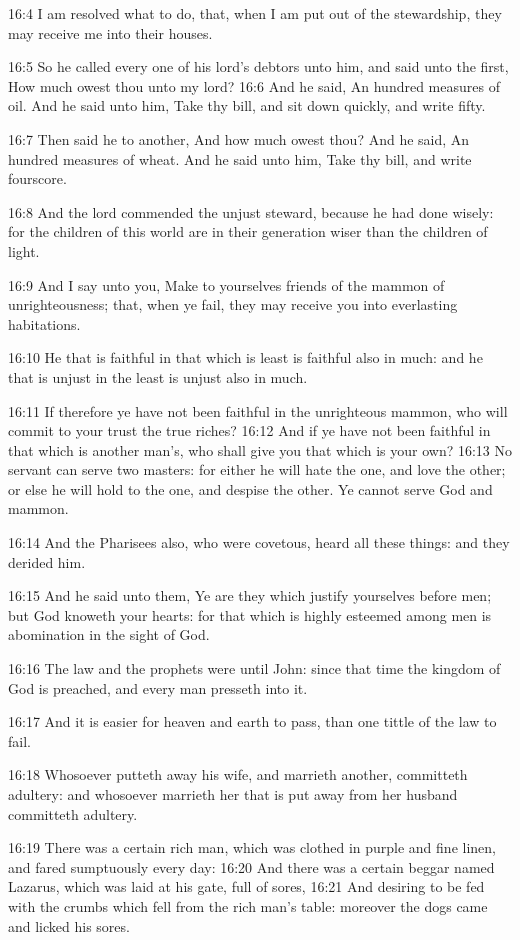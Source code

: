 16:4 I am resolved what to do, that, when I am put out of the
stewardship, they may receive me into their houses.

16:5 So he called every one of his lord's debtors unto him, and said
unto the first, How much owest thou unto my lord?  16:6 And he said,
An hundred measures of oil. And he said unto him, Take thy bill, and
sit down quickly, and write fifty.

16:7 Then said he to another, And how much owest thou? And he said, An
hundred measures of wheat. And he said unto him, Take thy bill, and
write fourscore.

16:8 And the lord commended the unjust steward, because he had done
wisely: for the children of this world are in their generation wiser
than the children of light.

16:9 And I say unto you, Make to yourselves friends of the mammon of
unrighteousness; that, when ye fail, they may receive you into
everlasting habitations.

16:10 He that is faithful in that which is least is faithful also in
much: and he that is unjust in the least is unjust also in much.

16:11 If therefore ye have not been faithful in the unrighteous
mammon, who will commit to your trust the true riches?  16:12 And if
ye have not been faithful in that which is another man's, who shall
give you that which is your own?  16:13 No servant can serve two
masters: for either he will hate the one, and love the other; or else
he will hold to the one, and despise the other. Ye cannot serve God
and mammon.

16:14 And the Pharisees also, who were covetous, heard all these
things: and they derided him.

16:15 And he said unto them, Ye are they which justify yourselves
before men; but God knoweth your hearts: for that which is highly
esteemed among men is abomination in the sight of God.

16:16 The law and the prophets were until John: since that time the
kingdom of God is preached, and every man presseth into it.

16:17 And it is easier for heaven and earth to pass, than one tittle
of the law to fail.

16:18 Whosoever putteth away his wife, and marrieth another,
committeth adultery: and whosoever marrieth her that is put away from
her husband committeth adultery.

16:19 There was a certain rich man, which was clothed in purple and
fine linen, and fared sumptuously every day: 16:20 And there was a
certain beggar named Lazarus, which was laid at his gate, full of
sores, 16:21 And desiring to be fed with the crumbs which fell from
the rich man's table: moreover the dogs came and licked his sores.

